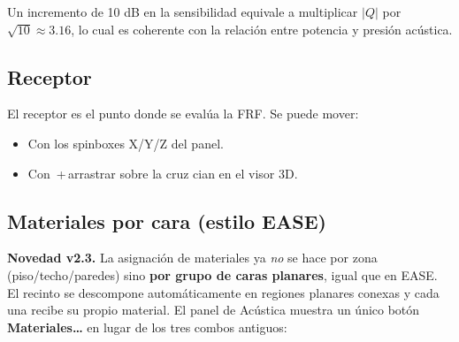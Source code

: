 \documentclass[11pt, a4paper]{article}
\newenvironment{nota}[1][Nota]{%
  \begin{tcolorbox}[mybox=cBlue, title={#1}]%
}{\end{tcolorbox}}
\newcommand{\tecla}[1]{\texttt{\small\fbox{#1}}}
\newcommand{\menu}[1]{\textbf{\guillemotleft #1\guillemotright}}
\begin{document}
\begin{nota}
  Un incremento de 10 dB en la sensibilidad equivale a multiplicar $|Q|$ por
  $\sqrt{10} \approx 3.16$, lo cual es coherente con la relación entre potencia
  y presión acústica.
\end{nota}

\subsection{Receptor}

El receptor es el punto donde se evalúa la FRF. Se puede mover:
\begin{itemize}[itemsep=2pt]
  \item Con los spinboxes X/Y/Z del panel.
  \item Con \tecla{Shift}\,+\,arrastrar sobre la cruz cian en el visor 3D.
\end{itemize}

\subsection{Materiales por cara (estilo EASE)}

\textbf{Novedad v2.3.} La asignación de materiales ya \emph{no} se hace
por zona (piso/techo/paredes) sino \textbf{por grupo de caras planares},
igual que en EASE. El recinto se descompone automáticamente en regiones
planares conexas y cada una recibe su propio material. El panel de
Acústica muestra un único botón \menu{Materiales\ldots}
en lugar de los tres combos antiguos:

\begin{center}
\end{center}
\end{document}
